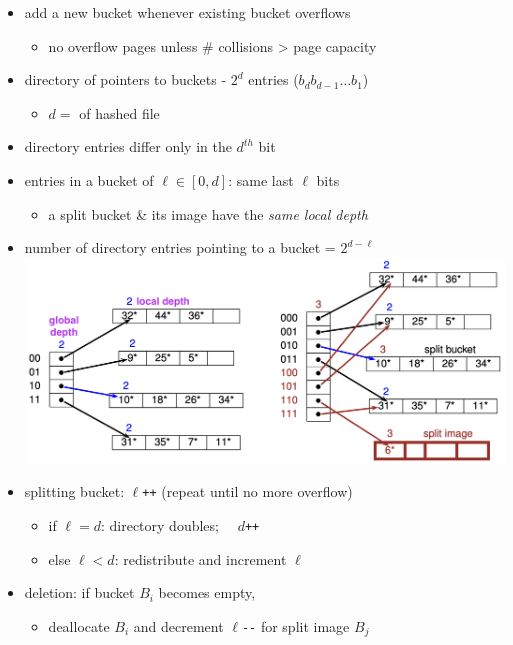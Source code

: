 \documentclass[10pt, landscape]{article}
\begin{document}
\begin{multicols*}{4}
  \begin{itemize}
    \item add a new bucket whenever existing bucket overflows 
      \begin{itemize}
        \item no overflow pages unless \# collisions > page capacity 
      \end{itemize}
    \item directory of pointers to buckets - $2^d$ entries ($b_db_{d-1}\dots b_1$)
      \begin{itemize}
        \item $d=$  of hashed file
      \end{itemize}
    \item {} directory entries differ only in the $d^{th}$ bit
    \item entries in a bucket of  $\ell \in [0,d]$: same last $\ell$ bits
      \begin{itemize}
        \item a split bucket \& its image have the \textit{same local depth}
      \end{itemize}
    \item number of directory entries pointing to a bucket = $2^{d-\ell}$
      \includegraphics[width=0.95\linewidth]{cs3223-extendible-hashing.png} 
    \item splitting bucket: $\ell$\texttt{++} (repeat until no more overflow)
      \begin{itemize}
        \item if $\ell = d$: directory doubles; $\quad d$\texttt{++}
        \item else $\ell < d$: redistribute and increment $\ell$
      \end{itemize}
    \item deletion: if bucket $B_i$ becomes empty,
      \begin{itemize}
        \item deallocate $B_i$ and decrement $\ell$\texttt{-{}-} for split image $B_j$

\end{itemize}
\end{itemize}
\end{multicols*}
\end{document}

